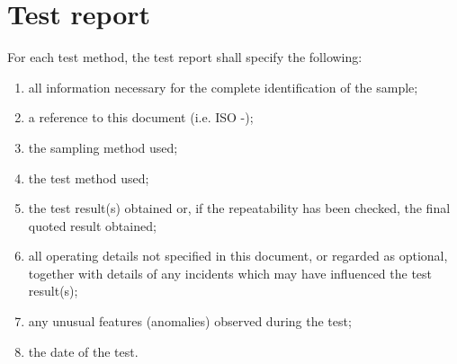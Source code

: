 \section{Test report}
\label{clause7}

For each test method, the test report shall specify the following:

\begin{enumerate}
  \item all information necessary for the complete identification of the sample;
  \item a reference to this document (i.e. ISO -);
  \item the sampling method used;
  \item the test method used;
  \item the test result(s) obtained or, if the repeatability has been checked, the final quoted result obtained;
  \item all operating details not specified in this document, or regarded as optional, together with details of any incidents which may have influenced the test result(s);
  \item any unusual features (anomalies) observed during the test;
  \item the date of the test.
\end{enumerate}
